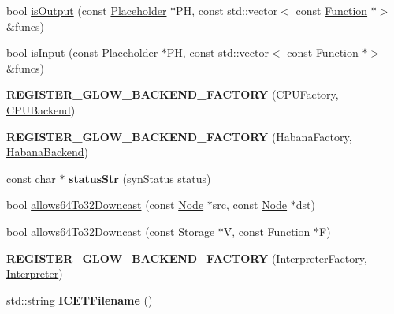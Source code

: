 \begin{DoxyCompactItemize}
bool \hyperlink{namespaceglow_ab3c36fb4023b57b7f2ea10ac4fe9c459}{is\+Output} (const \hyperlink{classglow_1_1_placeholder}{Placeholder} $\ast$PH, const std\+::vector$<$ const \hyperlink{classglow_1_1_function}{Function} $\ast$$>$ \&funcs)
\item 
bool \hyperlink{namespaceglow_aac10131240fff18a61a4f525541fe765}{is\+Input} (const \hyperlink{classglow_1_1_placeholder}{Placeholder} $\ast$PH, const std\+::vector$<$ const \hyperlink{classglow_1_1_function}{Function} $\ast$$>$ \&funcs)
\item 
\mbox{\label{namespaceglow_a57baaa229ed26f9593c1310e626b39d3}} 
{\bfseries R\+E\+G\+I\+S\+T\+E\+R\+\_\+\+G\+L\+O\+W\+\_\+\+B\+A\+C\+K\+E\+N\+D\+\_\+\+F\+A\+C\+T\+O\+RY} (C\+P\+U\+Factory, \hyperlink{classglow_1_1_c_p_u_backend}{C\+P\+U\+Backend})
\item 
\mbox{\label{namespaceglow_a6150442fd9a79c89605e8e0a723fad58}} 
{\bfseries R\+E\+G\+I\+S\+T\+E\+R\+\_\+\+G\+L\+O\+W\+\_\+\+B\+A\+C\+K\+E\+N\+D\+\_\+\+F\+A\+C\+T\+O\+RY} (Habana\+Factory, \hyperlink{classglow_1_1_habana_backend}{Habana\+Backend})
\item 
\mbox{\label{namespaceglow_a8dd862f2c2d0fa00b3d1bd9a3fdf35e4}} 
const char $\ast$ {\bfseries status\+Str} (syn\+Status status)
\item 
bool \hyperlink{namespaceglow_a9052142cd801c37c1dd49a3b139682d9}{allows64\+To32\+Downcast} (const \hyperlink{classglow_1_1_node}{Node} $\ast$src, const \hyperlink{classglow_1_1_node}{Node} $\ast$dst)
\item 
bool \hyperlink{namespaceglow_ac2c06e353dbcd4a5d2af024633fdaadb}{allows64\+To32\+Downcast} (const \hyperlink{classglow_1_1_storage}{Storage} $\ast$V, const \hyperlink{classglow_1_1_function}{Function} $\ast$F)
\item 
\mbox{\label{namespaceglow_a627577fc0d983b88da24a4b104fd3c96}} 
{\bfseries R\+E\+G\+I\+S\+T\+E\+R\+\_\+\+G\+L\+O\+W\+\_\+\+B\+A\+C\+K\+E\+N\+D\+\_\+\+F\+A\+C\+T\+O\+RY} (Interpreter\+Factory, \hyperlink{classglow_1_1_interpreter}{Interpreter})
\item 
\mbox{\label{namespaceglow_aa35623fe1e4a06a0b10087a66fbed8df}} 
std\+::string {\bfseries I\+C\+E\+T\+Filename} ()
\item 
\mbox{\label{namespaceglow_a9d9490be40b9bc4366d81159a7745126}} 

\end{DoxyCompactItemize}
